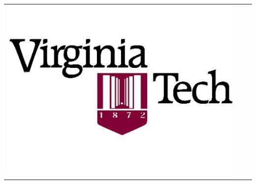 \documentclass[final]{beamer}
\newlength{\onecolwid}
\begin{document}
\begin{frame}[t]
\begin{columns}[t]
\begin{column}{\onecolwid}
\begin{center}
\begin{tabular}{ccc}
\includegraphics[width=0.4\linewidth]{Logo} 
\end{tabular}
\end{center}


\end{column} %

\end{columns} %

\end{frame} %
\end{document}

